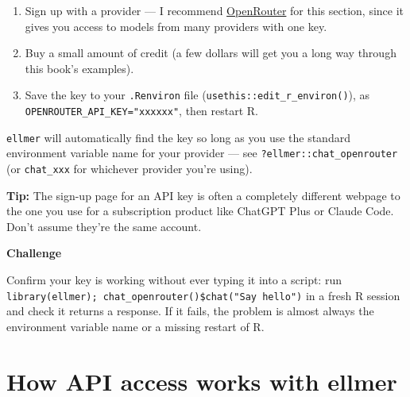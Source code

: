 \documentclass[
  letterpaper,
  DIV=11,
  numbers=noendperiod]{scrreprt}
\providecommand{\tightlist}{%
  \setlength{\itemsep}{0pt}\setlength{\parskip}{0pt}}
\begin{document}
\begin{enumerate}
\def\labelenumi{\arabic{enumi}.}
\tightlist
\item
  Sign up with a provider --- I recommend
  \href{https://accounts.openrouter.ai/sign-up}{OpenRouter} for this
  section, since it gives you access to models from many providers with
  one key.
\item
  Buy a small amount of credit (a few dollars will get you a long way
  through this book's examples).
\item
  Save the key to your \texttt{.Renviron} file
  (\texttt{usethis::edit\_r\_environ()}), as
  \texttt{OPENROUTER\_API\_KEY="xxxxxx"}, then restart R.
\end{enumerate}

\texttt{ellmer} will automatically find the key so long as you use the
standard environment variable name for your provider --- see
\texttt{?ellmer::chat\_openrouter} (or \texttt{chat\_xxx} for whichever
provider you're using).

\textbf{Tip:} The sign-up page for an API key is often a completely
different webpage to the one you use for a subscription product like
ChatGPT Plus or Claude Code. Don't assume they're the same account.

\begin{tcolorbox}[enhanced jigsaw, toprule=.15mm, rightrule=.15mm, left=2mm, leftrule=.75mm, breakable, opacityback=0, arc=.35mm, colframe=quarto-callout-important-color-frame, bottomrule=.15mm, colback=white]
\begin{minipage}[t]{5.5mm}
\textcolor{quarto-callout-important-color}{\faExclamation}
\end{minipage}%
\begin{minipage}[t]{\textwidth - 5.5mm}

\vspace{-3mm}\textbf{Challenge}\vspace{3mm}

Confirm your key is working without ever typing it into a script: run
\texttt{library(ellmer);\ chat\_openrouter()\$chat("Say\ hello")} in a
fresh R session and check it returns a response. If it fails, the
problem is almost always the environment variable name or a missing
restart of R.

\end{minipage}%
\end{tcolorbox}

\chapter{How API access works with
ellmer}\label{how-api-access-works-with-ellmer}
\end{document}
